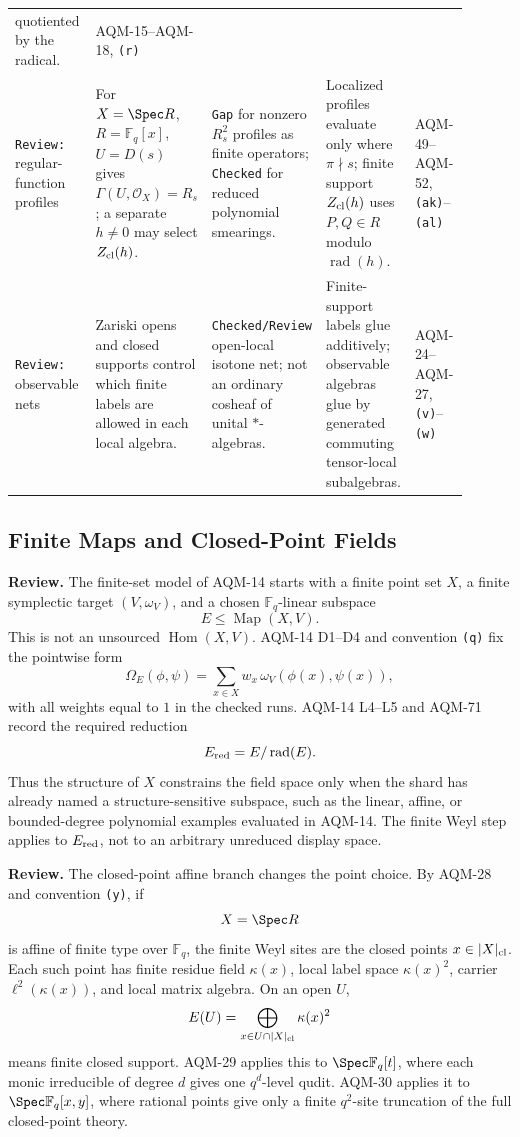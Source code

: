 \begin{center}
\begin{tabular}{p{0.18\linewidth}p{0.22\linewidth}p{0.19\linewidth}p{0.19\linewidth}p{0.12\linewidth}}
quotiented by the radical. &
AQM-15--AQM-18, \texttt{(r)} \\
\addlinespace
\texttt{Review:} regular-function profiles &
For \(X=\Spec R\), \(R=\mathbb F_q[x]\), \(U=D(s)\) gives
\(\Gamma(U,\mathcal O_X)=R_s\); a separate \(h\ne0\) may select \(Z_{\rm cl}(h)\). &
\texttt{Gap} for nonzero \(R_s^2\) profiles as finite operators;
\texttt{Checked} for reduced polynomial smearings. &
Localized profiles evaluate only where \(\pi\nmid s\); finite support
\(Z_{\rm cl}(h)\) uses \(P,Q\in R\) modulo \(\operatorname{rad}(h)\). &
AQM-49--AQM-52, \texttt{(ak)}--\texttt{(al)} \\
\addlinespace
\texttt{Review:} observable nets &
Zariski opens and closed supports control which finite labels are allowed in
each local algebra. &
\texttt{Checked/Review} open-local isotone net; not an ordinary cosheaf of
unital \(*\)-algebras. &
Finite-support labels glue additively; observable algebras glue by generated
commuting tensor-local subalgebras. &
AQM-24--AQM-27, \texttt{(v)}--\texttt{(w)} \\
\bottomrule
\end{tabular}
\end{center}

\subsection{Finite Maps and Closed-Point Fields}

\textbf{Review.}  The finite-set model of AQM-14 starts with a finite point set
\(X\), a finite symplectic target \((V,\omega_V)\), and a chosen
\(\mathbb F_q\)-linear subspace
\[
  E\leq \operatorname{Map}(X,V).
\]
This is not an unsourced \(\operatorname{Hom}(X,V)\).  AQM-14 D1--D4 and
convention \texttt{(q)} fix the pointwise form
\[
  \Omega_E(\phi,\psi)=
  \sum_{x\in X}w_x\,\omega_V(\phi(x),\psi(x)),
\]
with all weights equal to \(1\) in the checked runs.  AQM-14 L4--L5 and
AQM-71 record the required reduction
\[
  E_{\rm red}=E/\operatorname{rad}(E).
\]
Thus the structure of \(X\) constrains the field space only when the shard
has already named a structure-sensitive subspace, such as the linear, affine,
or bounded-degree polynomial examples evaluated in AQM-14.  The finite Weyl
step applies to \(E_{\rm red}\), not to an arbitrary unreduced display space.

\textbf{Review.}  The closed-point affine branch changes the point choice.
By AQM-28 and convention \texttt{(y)}, if
\[
  X=\Spec R
\]
is affine of finite type over \(\mathbb F_q\), the finite Weyl sites are the
closed points \(x\in |X|_{\rm cl}\).  Each such point has finite residue field
\(\kappa(x)\), local label space \(\kappa(x)^2\), carrier
\(\ell^2(\kappa(x))\), and local matrix algebra.  On an open \(U\),
\[
  E(U)=\bigoplus_{x\in U\cap |X|_{\rm cl}}\kappa(x)^2
\]
means finite closed support.  AQM-29 applies this to \(\Spec\mathbb F_q[t]\),
where each monic irreducible of degree \(d\) gives one \(q^d\)-level qudit.
AQM-30 applies it to \(\Spec\mathbb F_q[x,y]\), where rational points give
only a finite \(q^2\)-site truncation of the full closed-point theory.

